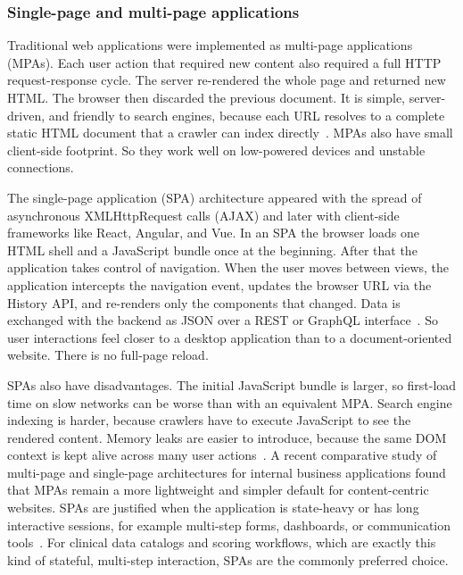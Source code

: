 \subsubsection{Single-page and multi-page applications}
\label{subsec:spa_mpa}

Traditional web applications were implemented as multi-page applications (MPAs). Each user action that required new content also required a full HTTP request-response cycle. The server re-rendered the whole page and returned new HTML. The browser then discarded the previous document. It is simple, server-driven, and friendly to search engines, because each URL resolves to a complete static HTML document that a crawler can index directly~\cite{olshevska2018spa_mpa, clean_commit_spa_mpa_2023}. MPAs also have small client-side footprint. So they work well on low-powered devices and unstable connections.

The single-page application (SPA) architecture appeared with the spread of asynchronous XMLHttpRequest calls (AJAX) and later with client-side frameworks like React, Angular, and Vue. In an SPA the browser loads one HTML shell and a JavaScript bundle once at the beginning. After that the application takes control of navigation. When the user moves between views, the application intercepts the navigation event, updates the browser URL via the History API, and re-renders only the components that changed. Data is exchanged with the backend as JSON over a REST or GraphQL interface~\cite{kornienko2021spa_secure, oneseventech_spa_mpa_2023}. So user interactions feel closer to a desktop application than to a document-oriented website. There is no full-page reload.

SPAs also have disadvantages. The initial JavaScript bundle is larger, so first-load time on slow networks can be worse than with an equivalent MPA. Search engine indexing is harder, because crawlers have to execute JavaScript to see the rendered content. Memory leaks are easier to introduce, because the same DOM context is kept alive across many user actions~\cite{olshevska2018spa_mpa}. A recent comparative study of multi-page and single-page architectures for internal business applications found that MPAs remain a more lightweight and simpler default for content-centric websites. SPAs are justified when the application is state-heavy or has long interactive sessions, for example multi-step forms, dashboards, or communication tools~\cite{clean_commit_spa_mpa_2023}. For clinical data catalogs and scoring workflows, which are exactly this kind of stateful, multi-step interaction, SPAs are the commonly preferred choice.

